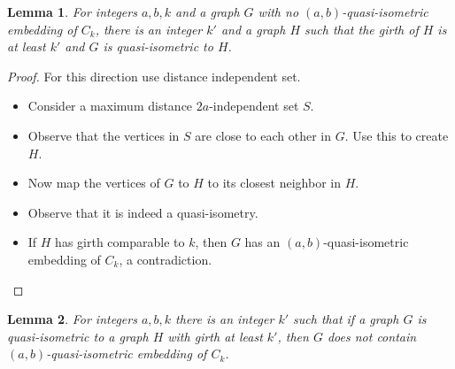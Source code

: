 \documentclass[a4paper]{article}
\newtheorem{lemma}{Lemma}
\begin{document}
\begin{lemma}
For integers $a,b,k$ and a graph $G$ with no $(a,b)$-quasi-isometric embedding of $C_k$,  there is an integer $k'$ and a graph $H$ such that the girth of $H$ is at least $k'$ and $G$ is quasi-isometric to $H$.
\end{lemma}

\begin{proof}
	For this direction use distance independent set. 
	
	\begin{itemize}
		\item Consider a maximum distance $2a$-independent set $S$.
		 
		 \item Observe that the  vertices in $S$ are close to each other in $G$. Use this to create $H$.
		 
		 \item Now map the vertices of $G$ to $H$ to its closest neighbor in $H$. 
		 
		 \item Observe that it is indeed a quasi-isometry.
		 
		 \item If $H$ has girth comparable to $k$, then $G$ has an $(a,b)$-quasi-isometric embedding of $C_k$, a contradiction.
	\end{itemize}
\end{proof}


\begin{lemma}
	For integers $a,b,k$ there is an integer $k'$ such that if a graph $G$ is quasi-isometric to a graph $H$ with girth at least $k'$, then $G$ does not contain $(a,b)$-quasi-isometric embedding of $C_k$. 
\end{lemma}
\end{document}

